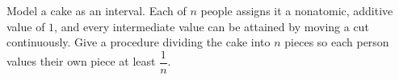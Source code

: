 Model a cake as an interval. Each of $n$ people assigns it a nonatomic, additive value of $1$, and every intermediate value can be attained by moving a cut continuously. Give a procedure dividing the cake into $n$ pieces so each person values their own piece at least $\dfrac{1}{n}$.
